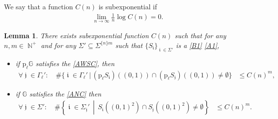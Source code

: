 \documentclass[a4paper, 11pt]{article}
\DeclareMathOperator{\N}{\mathbb{N}}
\DeclareMathOperator{\iii}{\mathfrak{i}}
\DeclareMathOperator{\jjj}{\mathfrak{j}}
\numberwithin{equation}{section}
\theoremstyle{plain}
\newtheorem{lemma}[theorem]{Lemma}
\theoremstyle{remark}
\theoremstyle{definition}
\begin{document}
We say that a function $C(n)$ is subexponential if 
\begin{align*}
\lim_{n \to \infty}\frac{1}{n} \log C(n) = 0.
\end{align*}

\begin{lemma} \label{lemma:WSCnew}
There exists subexponential function $C(n)$ such that for any $n,m \in \N^+$ and for any $\Sigma' \subseteq \Sigma^{\{n\}m}$ such that $\{S_{\iii}\}_{\iii \in \Sigma'}$ is a \ref{B1} \ref{A1},
\begin{itemize}
\item if $\mathrm{p}_\ell \mathbb{G}$ satisfies the \ref{AWSC}, then 
\begin{align}
\forall \jjj \in \Gamma_{\ell}': \quad \# \big\{\iii \in \Gamma_\ell' \, \big|\, (\mathrm{p}_\ell S_{\iii})((0,1)) \cap (\mathrm{p}_\ell S_{\jjj})((0,1)) \neq \emptyset \big\} &\leq C(n)^{m},\label{eq:WSCuse2}
\end{align}
\item if $\mathbb{G}$ satisfies the \ref{ANC} then
\begin{align}
\forall \jjj \in \Sigma': \quad \# \left\{\iii \in \Sigma_{\jjj}' \, \middle|\, S_{\iii}((0,1)^2) \cap S_{\jjj}((0,1)^2) \neq \emptyset \right\} &\leq C(n)^{m}\label{eq:WCSuse1}.
\end{align}
\end{itemize}
\end{lemma}
\end{document}
